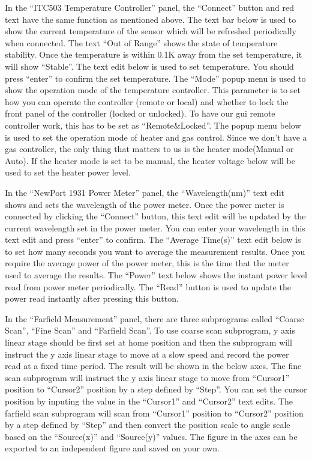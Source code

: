 \documentclass[a4paper,12pt]{article}
\begin{document}
In the ``ITC503 Temperature Controller'' panel, the ``Connect'' button and red text
have the same function as mentioned above. The text bar below is used to show
the current temperature of the sensor which will be refreshed periodically when
connected. The text ``Out of Range'' shows the state of temperature stability.
Once the temperature is within 0.1K away from the set temperature, it will show
``Stable''. The text edit below is used to set temperature. You should press
``enter'' to confirm the set temperature. The ``Mode'' popup menu is used to show
the operation mode of the temperature controller. This parameter is to set how
you can operate the controller (remote or local) and whether to lock the front
panel of the controller (locked or unlocked). To have our gui remote controller
work, this has to be set as ``Remote\&Locked''. The popup menu below is used to
set the operation mode of heater and gas control. Since we don't have a gas
controller, the only thing that matters to us is the heater mode(Manual or
Auto). If the heater mode is set to be manual, the heater voltage below will be
used to set the heater power level. 

In the ``NewPort 1931 Power Meter'' panel, the ``Wavelength(nm)'' text edit shows
and sets the wavelength of the power meter. Once the power meter is connected by
clicking the ``Connect'' button, this text edit will be updated by the current
wavelength set in the power meter. You can enter your wavelength in this text
edit and press ``enter'' to confirm. The ``Average Time(s)'' text edit below is to
set how many seconds you want to average the measurement results. Once you
require the average power of the power meter, this is the time that the meter
used to average the results. The ``Power'' text below shows the instant power
level read from power meter periodically. The ``Read'' button is used to update
the power read instantly after pressing this button. 

In the ``Farfield Measurement'' panel, there are three subprograms called
``Coarse Scan'', ``Fine Scan'' and ``Farfield Scan''. To use coarse scan
subprogram, y axis linear stage should be first set at home position and then
the subprogram will instruct the y axis linear stage to move at a slow speed and
record the power read at a fixed time period. The result will be shown in the
below axes. The fine scan subprogram will instruct the y axis linear stage to
move from ``Cursor1'' position to ``Cursor2'' position by a step defined by
``Step''. You can set the cursor position by inputing the value in the
``Cursor1'' and ``Cursor2'' text edits. The farfield scan subprogram will scan
from ``Cursor1'' position to ``Cursor2'' position by a step defined by ``Step''
and then convert the position scale to angle scale based on the ``Source(x)''
and ``Source(y)'' values. The figure in the axes can be exported to an
independent figure and saved on your own. 
\end{document}

